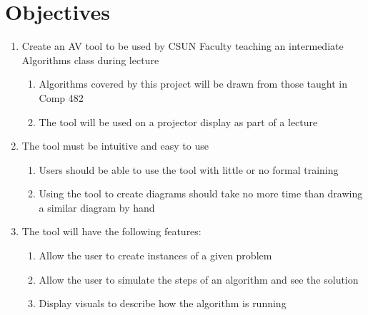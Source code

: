 \section{Objectives}
\begin{enumerate}
	\item Create an AV tool to be used by CSUN Faculty 
		teaching an intermediate Algorithms class during lecture
		\begin{enumerate}
			\item Algorithms covered by this project will be drawn from 
				those taught in Comp 482
			\item The tool will be used on a projector display as part of a lecture
		\end{enumerate}
	\item The tool must be intuitive and easy to use
		\begin{enumerate}
			\item Users should be able to use the tool with little or no 
				formal training
			\item Using the tool to create diagrams should take no more time 
				than drawing a similar diagram by hand
		\end{enumerate}
	\item The tool will have the following features:
	\begin{enumerate}
		\item Allow the user to create instances of a given problem
		\item Allow the user to simulate the steps of an algorithm 
			and see the solution
		\item Display visuals to describe how the algorithm is running
	\end{enumerate}
\end{enumerate}
